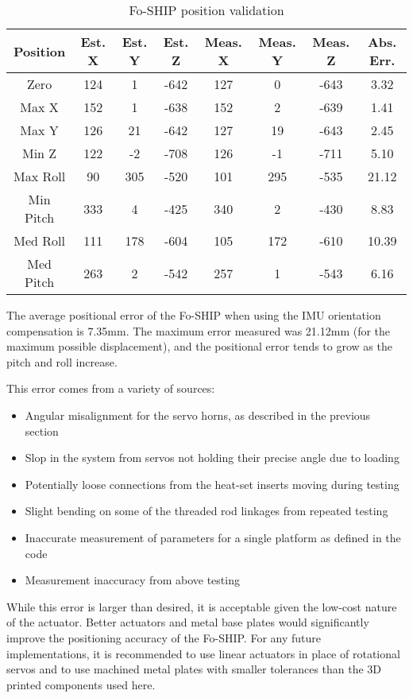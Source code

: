 \documentclass[12pt,a4paper]{report}
\begin{document}
\begin{table}[htbp]
	\centering
	\caption{Fo-SHIP position validation}
	\label{tab:foshipvalid}
	\renewcommand{\arraystretch}{1.2}
	\begin{tabular}{|c|c|c|c|c|c|c|c|}
		\hline
		Position & Est. X & Est. Y & Est. Z & Meas. X & Meas. Y & Meas. Z & Abs. Err. \\
		\hline
		Zero & 124 & 1 & -642 & 127 & 0 & -643 & 3.32 \\
		\hline
		Max X & 152 & 1 & -638 & 152 & 2 & -639 & 1.41 \\
		\hline
		Max Y & 126 & 21 & -642 & 127 & 19 & -643 & 2.45 \\
		\hline
		Min Z & 122 & -2 & -708 & 126 & -1 & -711 & 5.10 \\
		\hline
		Max Roll & 90 & 305 & -520 & 101 & 295 & -535 & 21.12 \\
		\hline
		Min Pitch & 333 & 4 & -425 & 340 & 2 & -430 & 8.83 \\
		\hline
		Med Roll & 111 & 178 & -604 & 105 & 172 & -610 & 10.39 \\
		\hline
		Med Pitch & 263 & 2 & -542 & 257 & 1 & -543 & 6.16 \\
		\hline
	\end{tabular}
\end{table}

The average positional error of the Fo-SHIP when using the IMU orientation compensation is 7.35mm. The maximum error measured was 21.12mm (for the maximum possible displacement), and the positional error tends to grow as the pitch and roll increase.

\noindent This error comes from a variety of sources:

\begin{itemize}[noitemsep,topsep=0pt]
	\item Angular misalignment for the servo horns, as described in the previous section
	\item Slop in the system from servos not holding their precise angle due to loading
	\item Potentially loose connections from the heat-set inserts moving during testing
	\item Slight bending on some of the threaded rod linkages from repeated testing
	\item Inaccurate measurement of parameters for a single platform as defined in the code
	\item Measurement inaccuracy from above testing
\end{itemize}

While this error is larger than desired, it is acceptable given the low-cost nature of the actuator. Better actuators and metal base plates would significantly improve the positioning accuracy of the Fo-SHIP. For any future implementations, it is recommended to use linear actuators in place of rotational servos and to use machined metal plates with smaller tolerances than the 3D printed components used here.



\end{document}
